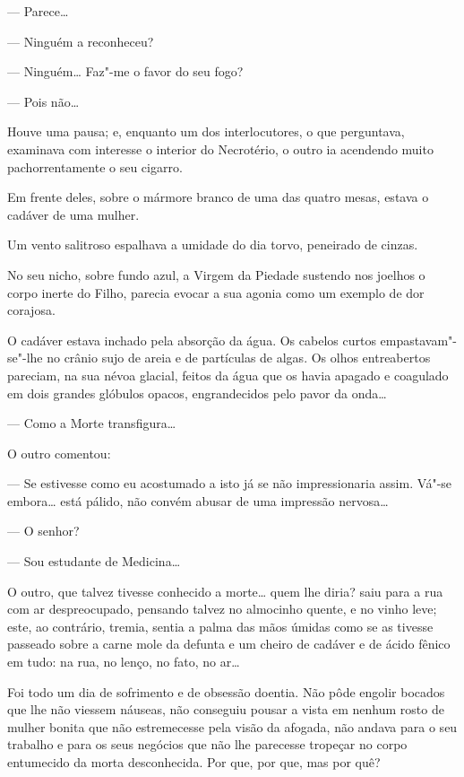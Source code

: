 --- Parece\ldots{}

--- Ninguém a reconheceu?

--- Ninguém\ldots{} Faz"-me o favor do seu fogo?

--- Pois não\ldots{}

Houve uma pausa; e, enquanto um dos interlocutores, o que perguntava,
examinava com interesse o interior do Necrotério, o outro ia acendendo
muito pachorrentamente o seu cigarro.

Em frente deles, sobre o mármore branco de uma das quatro mesas, estava
o cadáver de uma mulher.

Um vento salitroso espalhava a umidade do dia torvo, peneirado de
cinzas.

No seu nicho, sobre fundo azul, a Virgem da Piedade sustendo nos joelhos
o corpo inerte do Filho, parecia evocar a sua agonia como um exemplo de
dor corajosa.

O cadáver estava inchado pela absorção da água. Os cabelos curtos
empastavam"-se"-lhe no crânio sujo de areia e de partículas de algas. Os
olhos entreabertos pareciam, na sua névoa glacial, feitos da água que os
havia apagado e coagulado em dois grandes glóbulos opacos, engrandecidos
pelo pavor da onda\ldots{}

--- Como a Morte transfigura\ldots{}

O outro comentou:

--- Se estivesse como eu acostumado a isto já se não impressionaria
assim. Vá"-se embora\ldots{} está pálido, não convém abusar de uma impressão
nervosa\ldots{}

--- O senhor?

--- Sou estudante de Medicina\ldots{}

O outro, que talvez tivesse conhecido a morte\ldots{} quem lhe diria? saiu
para a rua com ar despreocupado, pensando talvez no almocinho quente, e
no vinho leve; este, ao contrário, tremia, sentia a palma das mãos
úmidas como se as tivesse passeado sobre a carne mole da defunta e um
cheiro de cadáver e de ácido fênico em tudo: na rua, no lenço, no fato,
no ar\ldots{}

Foi todo um dia de sofrimento e de obsessão doentia. Não pôde engolir
bocados que lhe não viessem náuseas, não conseguiu pousar a vista em
nenhum rosto de mulher bonita que não estremecesse pela visão da
afogada, não andava para o seu trabalho e para os seus negócios que não
lhe parecesse tropeçar no corpo entumecido da morta desconhecida. Por
que, por que, mas por quê?


